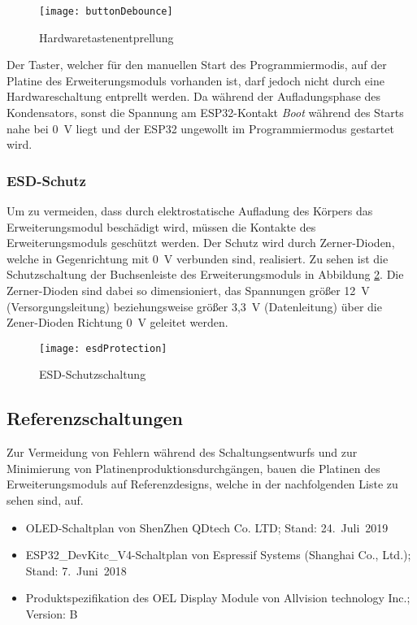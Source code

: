 \begin{figure}[h]
    \centering
    \texttt{[image: buttonDebounce]}
    \caption{Hardwaretastenentprellung}
    \label{fig:buttonDebounce}
\end{figure}

Der Taster, welcher für den manuellen Start des Programmiermodis, auf der Platine des Erweiterungsmoduls vorhanden ist, darf jedoch nicht durch eine Hardwareschaltung entprellt werden. Da während der Aufladungsphase des Kondensators, sonst die Spannung am ESP32-Kontakt \textit{Boot} während des Starts nahe bei 0~V liegt und der ESP32 ungewollt im Programmiermodus gestartet wird.

\subsubsection{\acf{ESD}-Schutz}
\label{section:esdProtection}
Um zu vermeiden, dass durch elektrostatische Aufladung des Körpers das Erweiterungsmodul beschädigt wird, müssen die Kontakte des Erweiterungsmoduls geschützt werden. Der Schutz wird durch Zerner-Dioden, welche in Gegenrichtung mit 0~V verbunden sind, realisiert. Zu sehen ist die Schutzschaltung der Buchsenleiste des Erweiterungsmoduls in Abbildung \ref{fig:esdProtection}. Die Zerner-Dioden sind dabei so dimensioniert, das Spannungen größer 12~V (Versorgungsleitung) beziehungsweise größer 3,3~V (Datenleitung) über die Zener-Dioden Richtung 0~V geleitet werden.

\begin{figure}[h]
    \centering
    \texttt{[image: esdProtection]}
    \caption{\ac{ESD}-Schutzschaltung}
    \label{fig:esdProtection}
\end{figure}

\subsection{Referenzschaltungen}
Zur Vermeidung von Fehlern während des Schaltungsentwurfs und zur Minimierung von Platinenproduktionsdurchgängen, bauen die Platinen des Erweiterungsmoduls auf Referenzdesigns, welche in der nachfolgenden Liste zu sehen sind, auf.

\begin{itemize}
    \item \acs{OLED}-Schaltplan von ShenZhen QDtech Co. LTD; Stand: 24.~Juli~2019
    \item ESP32\_DevKitc\_V4-Schaltplan von Espressif Systems (Shanghai Co., Ltd.); Stand: 7.~Juni~2018
    \item Produktspezifikation des OEL Display Module von Allvision technology Inc.; Version: B
\end{itemize}

